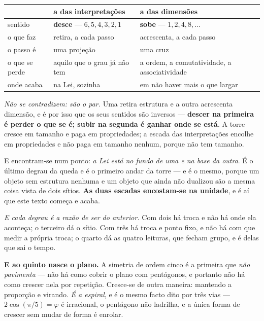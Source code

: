 \documentclass[livro.tex]{subfiles}
\begin{document}
\begin{center}\small
\begin{tabular}{@{}lll@{}}
\toprule
& \textbf{a das interpretações} & \textbf{a das dimensões} \\
\midrule
sentido & \textbf{desce} --- $6,5,4,3,2,1$ & \textbf{sobe} --- $1,2,4,8,\dots$ \\
o que faz & retira, a cada passo & acrescenta, a cada passo \\
o passo é & uma projeção & uma cruz \\
o que se perde & aquilo que o grau já não tem & a ordem, a comutatividade, a associatividade \\
onde acaba & na Lei, sozinha & em não haver mais o que largar \\
\bottomrule
\end{tabular}
\end{center}

\noindent \emph{Não se contradizem: são o par.} Uma retira estrutura e a outra acrescenta
dimensão, e é por isso que os seus sentidos são inversos --- \textbf{descer na primeira é perder o
que se é; subir na segunda é ganhar onde se está}. A torre cresce em tamanho e paga em
propriedades; a escada das interpretações encolhe em propriedades e não paga em tamanho nenhum,
porque não tem tamanho.

\medskip
\noindent E encontram-se num ponto: \emph{a Lei está no fundo de uma e na base da outra}. É o
último degrau da queda e é o primeiro andar da torre --- e é o mesmo, porque um objeto sem
estrutura nenhuma e um objeto que ainda não dualizou são a mesma coisa vista de dois sítios.
\textbf{As duas escadas encostam-se na unidade}, e é aí que este texto começa e acaba.

\medskip
\noindent \emph{E cada degrau é a razão de ser do anterior.} Com dois há troca e não há onde ela
aconteça; o terceiro dá o sítio. Com três há troca e ponto fixo, e não há com que medir a própria
troca; o quarto dá as quatro leituras, que fecham grupo, e é delas que sai o tempo.

\medskip
\noindent \textbf{E ao quinto nasce o plano.} A simetria de ordem cinco é a primeira que \emph{não
pavimenta} --- não há como cobrir o plano com pentágonos, e portanto não há como crescer nela por
repetição. Cresce-se de outra maneira: mantendo a proporção e virando. \emph{É a espiral}, e é o
mesmo facto dito por três vias --- $2\cos(\pi/5)=\varphi$ é irracional, o pentágono não ladrilha, e
a única forma de crescer sem mudar de forma é enrolar.
\end{document}
